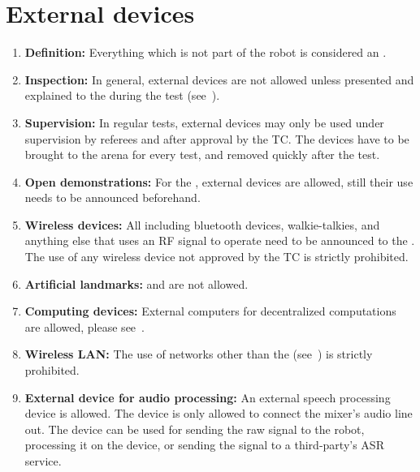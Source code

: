 \section{External devices}\label{rule:roobt_external_devices}
\begin{enumerate}
	\item \textbf{Definition:} Everything which is not part of the robot is considered an .
	\item \textbf{Inspection:} In general, external devices are not allowed unless presented and explained to the  during the  test (see~).
	\item \textbf{Supervision:} In regular tests, external devices may only be used under supervision by referees and after approval by the TC. The devices have to be brought to the arena for every test, and removed quickly after the test.
	\item \textbf{Open demonstrations:} For the , external devices are allowed, still their use needs to be announced beforehand.
	\item \textbf{Wireless devices:} All  including bluetooth devices, walkie-talkies, and anything else that uses an RF signal to operate need to be announced to the . The use of any wireless device not approved by the TC is strictly prohibited.
	\item \textbf{Artificial landmarks:}  and  are not allowed.
	\item \textbf{Computing devices:} External computers for decentralized computations are allowed, please see~.
	\item \textbf{Wireless LAN:} The use of networks other than the  (see~) is strictly prohibited.
	\item \textbf{External device for audio processing: }An external speech processing device is allowed. The device is only allowed to connect the mixer's audio line out. The device can be used for sending the raw signal to the robot, processing it on the device, or sending the signal to a third-party's ASR service.

\end{enumerate}
